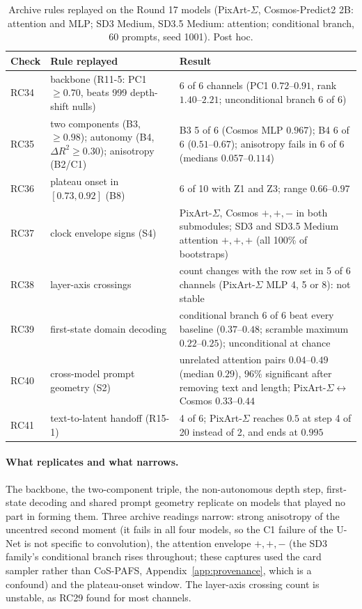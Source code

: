 \begin{table}[htbp]
\centering\footnotesize
\caption{Archive rules replayed on the Round 17 models (PixArt-$\Sigma$, Cosmos-Predict2 2B: attention and MLP; SD3 Medium, SD3.5 Medium: attention; conditional branch, 60 prompts, seed 1001). Post hoc.}
\label{tab:posthocR17}
\begin{tabularx}{\linewidth}{@{}l>{\raggedright\arraybackslash}p{3.6cm}L@{}}
\toprule
Check & Rule replayed & Result\\
\midrule
RC34 & backbone (R11-5: PC1 $\ge0.70$, beats 999 depth-shift nulls) & 6 of 6 channels (PC1 $0.72$--$0.91$, rank $1.40$--$2.21$; unconditional branch 6 of 6)\\
RC35 & two components (B3, $\ge0.98$); autonomy (B4, $\Delta R^2\ge0.30$); anisotropy (B2/C1) & B3 5 of 6 (Cosmos MLP $0.967$); B4 6 of 6 ($0.51$--$0.67$); anisotropy fails in 6 of 6 (medians $0.057$--$0.114$)\\
RC36 & plateau onset in $[0.73,0.92]$ (B8) & 6 of 10 with Z1 and Z3; range $0.66$--$0.97$\\
RC37 & clock envelope signs (S4) & PixArt-$\Sigma$, Cosmos $+,+,-$ in both submodules; SD3 and SD3.5 Medium attention $+,+,+$ (all 100\% of bootstraps)\\
RC38 & layer-axis crossings & count changes with the row set in 5 of 6 channels (PixArt-$\Sigma$ MLP 4, 5 or 8): not stable\\
RC39 & first-state domain decoding & conditional branch 6 of 6 beat every baseline ($0.37$--$0.48$; scramble maximum $0.22$--$0.25$); unconditional at chance\\
RC40 & cross-model prompt geometry (S2) & unrelated attention pairs $0.04$--$0.49$ (median $0.29$), $96\%$ significant after removing text and length; PixArt-$\Sigma$$\leftrightarrow$Cosmos $0.33$--$0.44$\\
RC41 & text-to-latent handoff (R15-1) & 4 of 6; PixArt-$\Sigma$ reaches $0.5$ at step 4 of 20 instead of 2, and ends at $0.995$\\
\bottomrule
\end{tabularx}
\end{table}

\paragraph{What replicates and what narrows.} The backbone, the two-component triple, the non-autonomous depth step, first-state decoding and shared prompt geometry replicate on models that played no part in forming them. Three archive readings narrow: strong anisotropy of the uncentred second moment (it fails in all four models, so the C1 failure of the U-Net is not specific to convolution), the attention envelope $+,+,-$ (the SD3 family's conditional branch rises throughout; these captures used the card sampler rather than CoS-PAFS, Appendix~\ref{app:provenance}, which is a confound) and the plateau-onset window. The layer-axis crossing count is unstable, as RC29 found for most channels.

